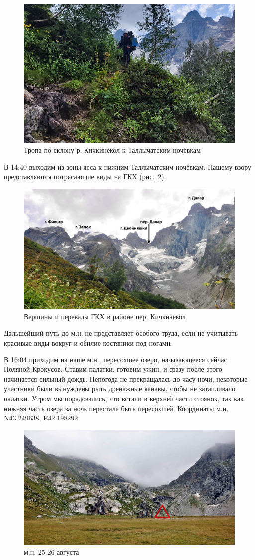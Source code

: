 \begin{figure}[h!]
	\centering
	\includegraphics[width=0.7\linewidth]{../pics/IMG_20240825_134744.jpg}
	\caption{Тропа по склону р. Кичкинекол к Таллычатским ночёвкам}
	\label{fig:IMG_20240825_134744.jpg}
\end{figure}


В 14:40 выходим из зоны леса к нижним Таллычатским ночёвкам. Нашему взору представляются потрясающие виды на ГКХ (рис.~\ref{fig:DSC_0158.JPG}). 

\begin{figure}[h!]
	\centering
	\includegraphics[width=0.7\linewidth]{../pics/DSC_0158.jpg}
	\caption{Вершины и перевалы ГКХ в районе пер. Кичкинекол}
	\label{fig:DSC_0158.JPG}
\end{figure}

Дальшейший путь до м.н. не представляет особого труда, если не учитывать красивые виды вокруг и обилие костяники под ногами.

В 16:04 приходим на наше м.н., пересохшее озеро, называющееся сейчас Поляной Крокусов. Ставим палатки, готовим ужин, и сразу после этого начинается сильный дождь. Непогода не прекращалась до часу ночи, некоторые участники были вынуждены рыть дренажные канавы, чтобы не затапливало палатки. Утром мы порадовались, что встали в верхней части стоянок, так как нижняя часть озера за ночь перестала быть пересохшей.
Координаты м.н. N43.249638\degree, E42.198292\degree.

\begin{figure}[h!]
	\centering
	\includegraphics[width=0.7\linewidth]{../pics/DSC_0177.jpg}
	\caption{м.н. 25-26 августа}
	\label{fig:DSC_0177.JPG}
\end{figure}




\newpage
